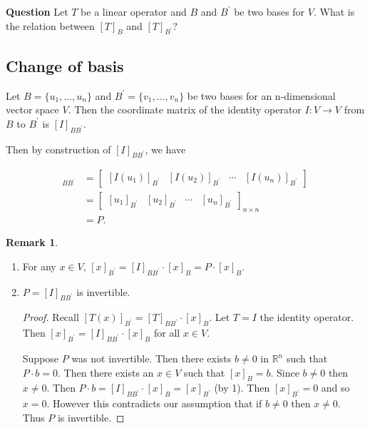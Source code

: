 \documentclass[12pt]{article}
\theoremstyle{definition}
\newtheorem*{remark}{Remark}
\begin{document}
\noindent \textbf{Question} Let $T$ be a linear operator and $B$ and $B^{\prime}$ be two
bases for $V$. What is the relation between $[T]_B$ and $[T]_{B^{\prime}}$?

\subsection{Change of basis}

Let $B = \{ u_1, \ldots, u_n \}$ and $B^{\prime} = \{v_1, \ldots, v_n\}$ be two bases
for an n-dimensional vector space $V$. Then the coordinate matrix of the identity
operator $I: V \rightarrow V$ from $B$ to $B^{\prime}$ is $[I]_{BB^{\prime}}$.

Then by construction of $[I]_{BB^{\prime}}$, we have

\begin{align*}
[I]_{BB^{\prime}} &= \begin{bmatrix} [I(u_1)]_{B^{\prime}} & [I(u_2)]_{B^{\prime}} &
\cdots & [I(u_n)]_{B^{\prime}} \end{bmatrix} \\
&= \begin{bmatrix} [u_1]_{B^{\prime}} & [u_2]_{B^{\prime}} & \cdots & [u_n]_{B^{\prime}}
\end{bmatrix}_{n \times n} \\
&= P.
\end{align*} 

\begin{remark} $ $
\begin{enumerate}[label = (\arabic*)]
\item For any $x \in V$, $[x]_{B^{\prime}} = [I]_{BB^{\prime}} \cdot [x]_B = P \cdot
[x]_B.$

\item $P = [I]_{BB^{\prime}}$ is invertible.

\begin{proof}
Recall $[T(x)]_{B^{\prime}} = [T]_{BB^{\prime}} \cdot [x]_B.$ Let $T = I$ the identity
operator. Then $[x]_{B^{\prime}} = [I]_{BB^{\prime}} \cdot [x]_B$ for all $x \in V$.

Suppose $P$ was not invertible. Then there exists $b \neq 0$ in $\mathbb{R}^n$
such that $P \cdot b = 0$. Then there exists an $x \in V$ such that $[x]_B = b$. Since
$b \neq 0$ then $x \neq 0$. Then $P \cdot b = [I]_{BB^{\prime}} \cdot [x]_B = 
[x]_{B^{\prime}}$ (by 1). Then $[x]_{B^{\prime}} = 0$ and so $x = 0$. However this
contradicts our assumption that if $b \neq 0$ then $x \neq 0$. Thus $P$ is invertible.
\end{proof}
\end{enumerate}
\end{remark}
\end{document}
